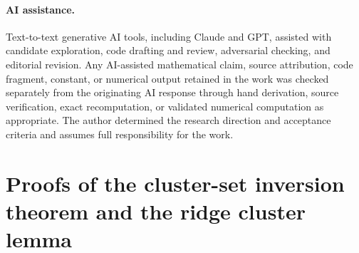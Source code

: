 \documentclass[11pt,twoside,leqno]{article}
\theoremstyle{plain}
\theoremstyle{definition}
\theoremstyle{remark}
\begin{document}
\paragraph{AI assistance.} Text-to-text generative AI tools, including Claude and GPT, assisted with candidate exploration, code drafting and review, adversarial checking, and editorial revision. Any AI-assisted mathematical claim, source attribution, code fragment, constant, or numerical output retained in the work was checked separately from the originating AI response through hand derivation, source verification, exact recomputation, or validated numerical computation as appropriate. The author determined the research direction and acceptance criteria and assumes full responsibility for the work.

\appendix
{}
\section{Proofs of the cluster-set inversion theorem and the ridge cluster lemma}\label{app:proof}
\end{document}
